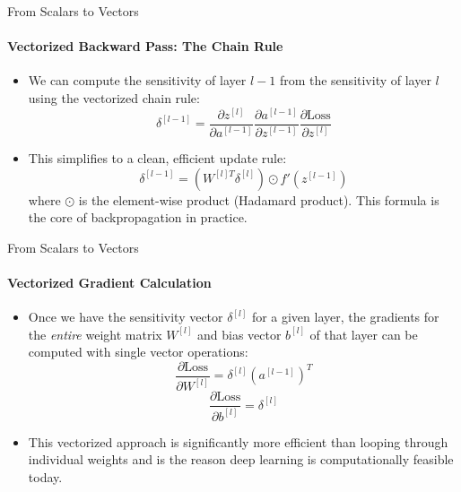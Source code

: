\begin{frame}{From Scalars to Vectors}
    \framesubtitle{Vectorized Backward Pass: The Chain Rule}
    \begin{itemize}
        \item We can compute the sensitivity of layer $l-1$ from the sensitivity of layer $l$ using the vectorized chain rule:
        \[ \delta^{[l-1]} = \frac{\partial z^{[l]}}{\partial a^{[l-1]}} \frac{\partial a^{[l-1]}}{\partial z^{[l-1]}} \frac{\partial \text{Loss}}{\partial z^{[l]}} \]
        \item This simplifies to a clean, efficient update rule:
        \[ \delta^{[l-1]} = (W^{[l]T}\delta^{[l]}) \odot f'(z^{[l-1]}) \]
        where $\odot$ is the element-wise product (Hadamard product). This formula is the core of backpropagation in practice.
    \end{itemize}
\end{frame}

\begin{frame}{From Scalars to Vectors}
    \framesubtitle{Vectorized Gradient Calculation}
    \begin{itemize}
        \item Once we have the sensitivity vector $\delta^{[l]}$ for a given layer, the gradients for the \emph{entire} weight matrix $W^{[l]}$ and bias vector $b^{[l]}$ of that layer can be computed with single vector operations:
        \[ \frac{\partial \text{Loss}}{\partial W^{[l]}} = \delta^{[l]}(a^{[l-1]})^{T} \]
        \[ \frac{\partial \text{Loss}}{\partial b^{[l]}} = \delta^{[l]} \]
        \item This vectorized approach is significantly more efficient than looping through individual weights and is the reason deep learning is computationally feasible today.
    \end{itemize}
\end{frame}